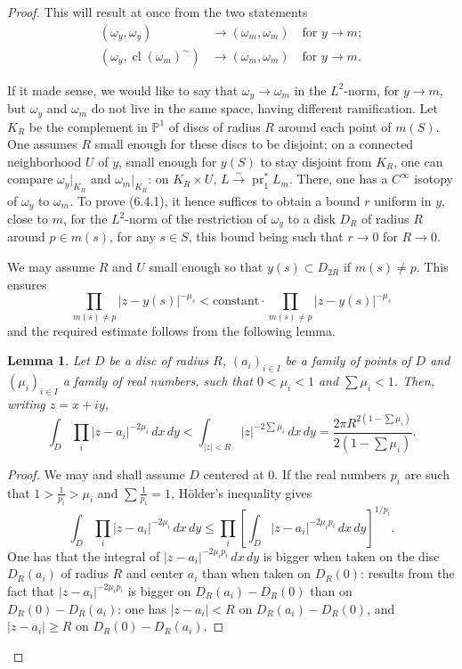 \documentclass[12pt,a4paper]{article}
\theoremstyle{plain}
\newtheorem{lemma}[theorem]{Lemma}
\theoremstyle{definition}
\theoremstyle{remark}
\newcommand{\PP}{\mathbb{P}}
\numberwithin{equation}{section}
\providecommand{\PP}{\mathbb{P}}
\providecommand{\pr}{\operatorname{pr}}
\providecommand{\cl}{\operatorname{cl}}
\begin{document}
\begin{proof}
This will result at once from the two statements
\begin{align}
(\omega_y, \omega_y) &\to (\omega_m, \omega_m) \quad \text{for } y \to m; \label{eq:6.4.1} \\
(\omega_y, \cl(\omega_m)^\sim) &\to (\omega_m, \omega_m) \quad \text{for } y \to m. \label{eq:6.4.2}
\end{align}

If it made sense, we would like to say that $\omega_y \to \omega_m$ in the $L^2$-norm, for $y \to m$, but $\omega_y$ and $\omega_m$ do not live in the same space, having different ramification. Let $K_R$ be the complement in $\PP^1$ of discs of radius $R$ around each point of $m(S)$. One assumes $R$ small enough for these discs to be disjoint; on a connected neighborhood $U$ of $y$, small enough for $y(S)$ to stay disjoint from $K_R$, one can compare $\omega_y|_{K_R}$ and $\omega_m|_{K_R}$: on $K_R \times U$, $L \xrightarrow{\sim} \pr_1^* L_m$. There, one has a $C^\infty$ isotopy of $\omega_y$ to $\omega_m$. To prove (6.4.1), it hence suffices to obtain a bound $r$ uniform in $y$, close to $m$, for the $L^2$-norm of the restriction of $\omega_y$ to a disk $D_R$ of radius $R$ around $p \in m(s)$, for any $s \in S$, this bound being such that $r \to 0$ for $R \to 0$.

We may assume $R$ and $U$ small enough so that $y(s) \subset D_{2R}$ if $m(s) \neq p$. This ensures
\[
\prod_{m(s) \neq p} |z - y(s)|^{-\mu_s} < \text{constant} \cdot \prod_{m(s) \neq p} |z - y(s)|^{-\mu_s}
\]
and the required estimate follows from the following lemma.

\begin{lemma}\label{lem:6.5}
Let $D$ be a disc of radius $R$, $(a_i)_{i \in I}$ be a family of points of $D$ and $(\mu_i)_{i \in I}$ a family of real numbers, such that $0 < \mu_i < 1$ and $\sum \mu_i < 1$. Then, writing $z = x + iy$,
\[
\int_D \prod_i |z - a_i|^{-2\mu_i} \, dx \, dy < \int_{|z| < R} |z|^{-2\sum \mu_i} \, dx \, dy = \frac{2\pi R^{2(1 - \sum \mu_i)}}{2(1 - \sum \mu_i)}.
\]
\end{lemma}

\begin{proof}
We may and shall assume $D$ centered at $0$. If the real numbers $p_i$ are such that $1 > \frac{1}{p_i} > \mu_i$ and $\sum \frac{1}{p_i} = 1$, H\"older's inequality gives
\[
\int_D \prod_i |z - a_i|^{-2\mu_i} \, dx \, dy \leq \prod_i \left[ \int_D |z - a_i|^{-2\mu_i p_i} \, dx \, dy \right]^{1/p_i}.
\]
One has that the integral of $|z - a_i|^{-2\mu_i p_i} \, dx \, dy$ is bigger when taken on the disc $D_R(a_i)$ of radius $R$ and center $a_i$ than when taken on $D_R(0)$: results from the fact that $|z - a_i|^{-2\mu_i p_i}$ is bigger on $D_R(a_i) - D_R(0)$ than on $D_R(0) - D_R(a_i)$: one has $|z - a_i| < R$ on $D_R(a_i) - D_R(0)$, and $|z - a_i| \geq R$ on $D_R(0) - D_R(a_i)$.


\end{proof}
\end{proof}
\end{document}
